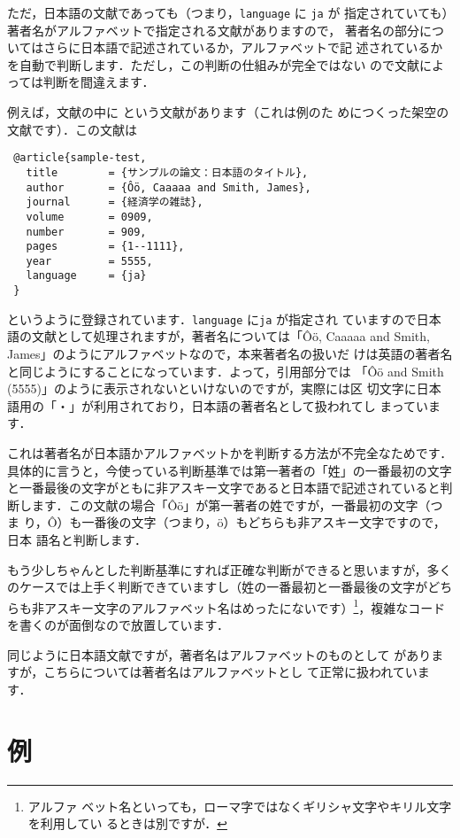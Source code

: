 \documentclass{ltjsarticle}
\begin{document}
ただ，日本語の文献であっても（つまり，\texttt{language} に \texttt{ja} が
指定されていても）著者名がアルファベットで指定される文献がありますので，
著者名の部分についてはさらに日本語で記述されているか，アルファベットで記
述されているかを自動で判断します．ただし，この判断の仕組みが完全ではない
ので文献によっては判断を間違えます．

例えば，文献の中に \citet{sample-test} という文献があります（これは例のた
めにつくった架空の文献です）．この文献は
\begin{verbatim}
 @article{sample-test,
   title        = {サンプルの論文：日本語のタイトル},
   author       = {Ôö, Caaaaa and Smith, James},
   journal      = {経済学の雑誌},
   volume       = 0909,
   number       = 909,
   pages        = {1--1111},
   year         = 5555,
   language     = {ja}
 }
\end{verbatim}
というように登録されています．\texttt{language} に\texttt{ja} が指定され
ていますので日本語の文献として処理されますが，著者名については「Ôö,
Caaaaa and Smith, James」のようにアルファベットなので，本来著者名の扱いだ
けは英語の著者名と同じようにすることになっています．よって，引用部分では
「Ôö and Smith (5555)」のように表示されないといけないのですが，実際には区
切文字に日本語用の「・」が利用されており，日本語の著者名として扱われてし
まっています．

これは著者名が日本語かアルファベットかを判断する方法が不完全なためです．
具体的に言うと，今使っている判断基準では第一著者の「姓」の一番最初の文字
と一番最後の文字がともに非アスキー文字であると日本語で記述されていると判
断します．この文献の場合「Ôö」が第一著者の姓ですが，一番最初の文字（つま
り，Ô）も一番後の文字（つまり，ö）もどちらも非アスキー文字ですので，日本
語名と判断します．

もう少しちゃんとした判断基準にすれば正確な判断ができると思いますが，多く
のケースでは上手く判断できていますし（姓の一番最初と一番最後の文字がどち
らも非アスキー文字のアルファベット名はめったにないです）\footnote{アルファ
ベット名といっても，ローマ字ではなくギリシャ文字やキリル文字を利用してい
るときは別ですが．}，複雑なコードを書くのが面倒なので放置しています．

同じように日本語文献ですが，著者名はアルファベットのものとして
\citet{Ryza2016} がありますが，こちらについては著者名はアルファベットとし
て正常に扱われています．

\section{例}
\end{document}
